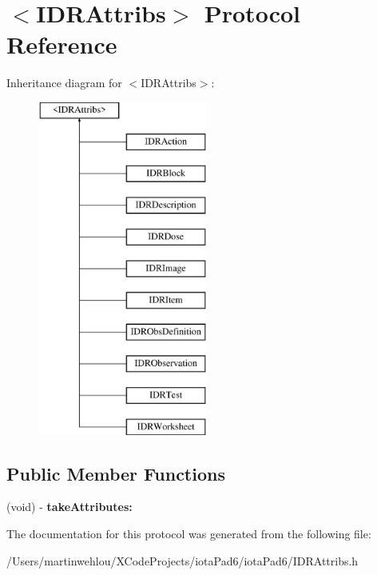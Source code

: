 \hypertarget{protocol_i_d_r_attribs-p}{
\section{$<$IDRAttribs$>$ Protocol Reference}
\label{protocol_i_d_r_attribs-p}
}
Inheritance diagram for $<$IDRAttribs$>$:\begin{figure}[H]
\begin{center}
\leavevmode
\includegraphics[height=11.000000cm]{protocol_i_d_r_attribs-p}
\end{center}
\end{figure}
\subsection*{Public Member Functions}
\begin{DoxyCompactItemize}
\item 
\hypertarget{protocol_i_d_r_attribs-p_a494be838118ccd7e3d56ba356e9c6b23}{
(void) -\/ {\bfseries takeAttributes:}}
\label{protocol_i_d_r_attribs-p_a494be838118ccd7e3d56ba356e9c6b23}

\end{DoxyCompactItemize}


The documentation for this protocol was generated from the following file:\begin{DoxyCompactItemize}
\item 
/Users/martinwehlou/XCodeProjects/iotaPad6/iotaPad6/IDRAttribs.h\end{DoxyCompactItemize}
